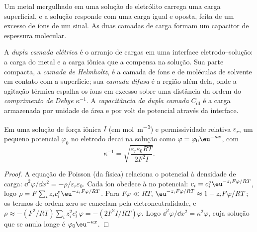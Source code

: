 Um metal mergulhado em uma solução de eletrólito carrega uma carga superficial, e
a solução responde com uma carga igual e oposta, feita de um excesso de íons de um
sinal. As duas camadas de carga formam um capacitor de espessura molecular.

\begin{definition}\label{def:b3:electrode-kinetics:double-layer}
A \emph{dupla camada elétrica} é o
arranjo de cargas em uma interface eletrodo--solução: a carga do metal e a carga
iônica que a compensa na solução. Sua parte compacta, a \emph{camada de
Helmholtz}, é a camada de íons e de moléculas de solvente
em contato com a superfície; sua \emph{camada difusa} é a região
além dela, onde a agitação térmica espalha os íons em excesso sobre uma distância
da ordem do \emph{comprimento de Debye} $\kappa^{-1}$. A
\emph{capacitância da dupla camada} $C_{\mathrm{dl}}$ é a carga
armazenada por unidade de área e por volt de potencial através da interface.
\end{definition}

\begin{proposition}\label{prop:b3:electrode-kinetics:debye-length}
Em uma solução de força iônica $I$ (em \unit{mol.m^{-3}}) e permissividade relativa
$\varepsilon_r$, um pequeno potencial $\varphi_0$ no eletrodo decai na solução como
$\varphi = \varphi_0\eu^{-\kappa x}$, com
\[
  \kappa^{-1} = \sqrt{\frac{\varepsilon_r\varepsilon_0RT}{2F^2I}} .
\]
\end{proposition}

\begin{proof}
A equação de Poisson (da física) relaciona o potencial à densidade de carga:
$\dd^2\varphi/\dd x^2 = -\rho/\varepsilon_r\varepsilon_0$. Cada íon obedece à  no
potencial: $c_i = c_i^{\circ}\eu^{-z_iF\varphi/RT}$, logo $\rho = F\sum_iz_ic_i^{\circ}\eu^{-z_iF\varphi/RT}$. Para $F\varphi \ll RT$,
$\eu^{-z_iF\varphi/RT} \approx 1 - z_iF\varphi/RT$; os termos de ordem zero se cancelam pela
eletroneutralidade, e $\rho \approx -(F^2/RT)\sum_iz_i^2c_i^{\circ}\,\varphi = -(2F^2I/RT)\varphi$. Logo $\dd^2\varphi/\dd x^2 = \kappa^2\varphi$, cuja
solução que se anula longe é $\varphi_0\eu^{-\kappa x}$.
\end{proof}

